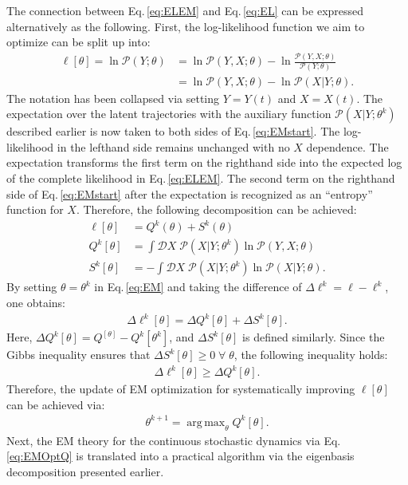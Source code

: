 \documentclass[journal=jpcbfk,manuscript=article,layout=twocolumn,articletitle=true]{achemso}
\DeclareMathOperator*{\argmax}{arg\,max}
\begin{document}
The connection between Eq.\,\ref{eq:ELEM} and Eq.\,\ref{eq:EL} can be expressed alternatively as the following. First, the log-likelihood function we aim to optimize can be split up into:
\begin{align}
\ell [\theta] = \ln \mathcal{P}(Y;\theta)&= \ln \mathcal{P}(Y,X;\theta) - \ln \frac{\mathcal{P}(Y,X;\theta)}{\mathcal{P}(Y;\theta)} \\
\label{eq:EMstart}
&=\ln \mathcal{P}(Y,X ; \theta) - \ln \mathcal{P}(X | Y;\theta).
\end{align}
The notation has been collapsed via setting $Y=Y(t)$ and $X=X(t)$. The expectation over the latent trajectories with the auxiliary function $\mathcal{P}(X|Y;\theta^k)$ described earlier is now taken to both sides of Eq.\,\ref{eq:EMstart}. The log-likelihood in the lefthand side remains unchanged with no $X$ dependence. The expectation transforms the first term on the righthand side into the expected log of the complete likelihood in Eq.\,\ref{eq:ELEM}. The second term on the righthand side of Eq.\,\ref{eq:EMstart} after the expectation is recognized as  an ``entropy'' function for $X$. Therefore, the following decomposition can be achieved:
\begin{align}
\label{eq:EM}
\ell [\theta] &= Q^k(\theta) + S^k(\theta)\\
\label{eq:EMQ}
Q^k[\theta] &=  \int \mathcal{D} X \; \mathcal{P}(X|Y;\theta^k)  \ln \mathcal{P}(Y,X ; \theta) \\
S^k[\theta] &= - \int \mathcal{D} X \; \mathcal{P}(X|Y;\theta^k)  \ln \mathcal{P}(X | Y; \theta).
\end{align}
By setting $\theta=\theta^k$ in Eq.\,\ref{eq:EM} and taking the difference of $\Delta \ell^k=\ell -\ell^k$, one obtains: 
\begin{align}
\Delta \ell^k[\theta] = \Delta Q^k[\theta] + \Delta S^k[\theta].
\end{align}
Here, $\Delta Q^k[\theta] = Q^[\theta] - Q^k[\theta^k]$, and $\Delta S^k[\theta]$ is defined similarly. Since the Gibbs inequality ensures that $\Delta S^k[\theta] \ge 0 \; \forall \; \theta$, the following inequality holds:
\begin{align}
\Delta \ell^k[\theta] \ge \Delta Q^k[\theta].
\end{align}
Therefore, the update of EM optimization for systematically improving $\ell[\theta]$ can be achieved via: 
\begin{align}
\label{eq:EMOptQ}
\theta^{k+1} = \argmax_{\theta} Q^k[\theta].
\end{align}
Next, the EM theory for the continuous stochastic dynamics via Eq.\,\ref{eq:EMOptQ} is translated into a practical algorithm via the eigenbasis decomposition presented earlier. 
\end{document}
